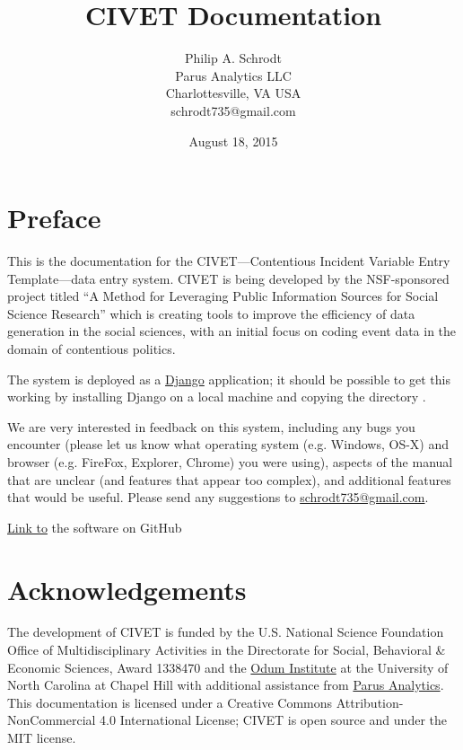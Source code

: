 \documentclass[letterpaper,10pt,english]{sphinxmanual}
\title{CIVET Documentation}
\date{August 18, 2015}
\author{Philip A. Schrodt\\Parus Analytics LLC\\Charlottesville, VA USA\\schrodt735@gmail.com}
\begin{document}
\maketitle
\tableofcontents
{}\label{index::doc}\section*{Preface}
This is the documentation for the CIVET—Contentious Incident Variable Entry Template—data entry system. CIVET is being developed by the NSF-sponsored project titled “A Method for Leveraging Public Information Sources for Social Science Research” which is creating tools to improve the efficiency of data generation in the social sciences, with an initial focus on coding event data in the domain of contentious politics.

The system is deployed as a \href{https://www.djangoproject.com/start/overview/}{Django} application; it should be possible to get this working by installing Django on a local machine and copying the directory .

We are very interested in feedback on this system, including any bugs
you encounter (please let us know what operating system (e.g. Windows,
OS-X) and browser (e.g. FireFox, Explorer, Chrome) you were using),
aspects of the manual that are unclear (and features that appear too
complex), and additional features that would be useful. Please send any
suggestions to \href{mailto:schrodt735@gmail.com}{schrodt735@gmail.com}.

\href{https://github.com/civet-software}{Link to} the software on GitHub
\section*{Acknowledgements}
The development of CIVET is funded by the U.S. National Science Foundation Office of Multidisciplinary Activities
in the Directorate for Social, Behavioral \& Economic Sciences, Award 1338470 and the \href{http://www.odum.unc.edu/odum/home2.jsp}{Odum Institute} at the University of North Carolina at Chapel Hill with additional assistance from \href{http://parusanalytics.com/}{Parus Analytics}. This documentation is licensed under a Creative Commons Attribution-NonCommercial 4.0 International License; CIVET is open source and under the MIT license.
\end{document}
